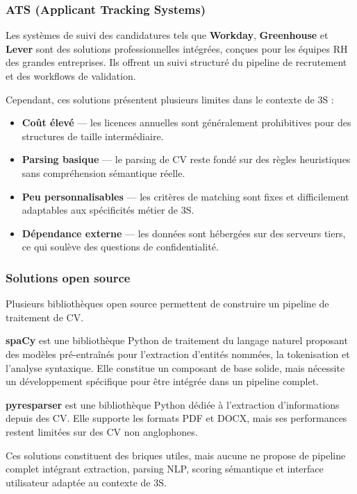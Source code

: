 \documentclass[12pt,a4paper]{report}
\begin{document}
\subsubsection{ATS (Applicant Tracking Systems)}

Les systèmes de suivi des candidatures tels que \textbf{Workday}, \textbf{Greenhouse} et \textbf{Lever} sont des solutions professionnelles intégrées, conçues pour les équipes RH des grandes entreprises. Ils offrent un suivi structuré du pipeline de recrutement et des workflows de validation.

Cependant, ces solutions présentent plusieurs limites dans le contexte de 3S :
\begin{itemize}
  \item \textbf{Coût élevé} — les licences annuelles sont généralement prohibitives pour des structures de taille intermédiaire.
  \item \textbf{Parsing basique} — le parsing de CV reste fondé sur des règles heuristiques sans compréhension sémantique réelle.
  \item \textbf{Peu personnalisables} — les critères de matching sont fixes et difficilement adaptables aux spécificités métier de 3S.
  \item \textbf{Dépendance externe} — les données sont hébergées sur des serveurs tiers, ce qui soulève des questions de confidentialité.
\end{itemize}

\subsubsection{Solutions open source}

Plusieurs bibliothèques open source permettent de construire un pipeline de traitement de CV.

\textbf{spaCy} est une bibliothèque Python de traitement du langage naturel proposant des modèles pré-entraînés pour l'extraction d'entités nommées, la tokenisation et l'analyse syntaxique. Elle constitue un composant de base solide, mais nécessite un développement spécifique pour être intégrée dans un pipeline complet.

\textbf{pyresparser} est une bibliothèque Python dédiée à l'extraction d'informations depuis des CV. Elle supporte les formats PDF et DOCX, mais ses performances restent limitées sur des CV non anglophones.

Ces solutions constituent des briques utiles, mais aucune ne propose de pipeline complet intégrant extraction, parsing NLP, scoring sémantique et interface utilisateur adaptée au contexte de 3S.
\end{document}

